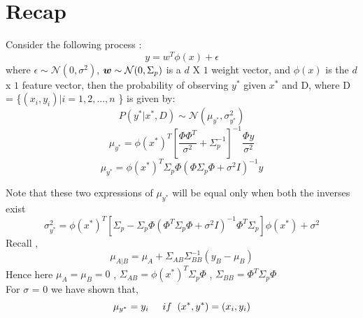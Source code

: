 \documentclass[12pt]{article}
\begin{document}
	\MakeScribeTop


\section{Recap}
Consider the following process :
\begin{equation}
    y=w^T\phi(x) + \epsilon 
\end{equation}
where $\epsilon \sim \mathcal{N}(0,\sigma^2)$, ${\boldsymbol w} \sim \mathcal{N}(0,\Sigma_p)$ is a $d$ X $1$ weight vector, and $\phi(x)$ is the $d$ x $1$ feature vector, then the probability of observing $y^*$ given $x^*$ and D, where D = \{$(x_i,y_i) | i=1,2,...,n$ \} is given by:  \\
\begin{equation*}
   P(y^*|x^*,D) \sim \mathcal{N}(\mu_{y^*},\sigma_{y^*}^2)
\end{equation*}
\begin{equation}
   \mu_{y^*} = \phi(x^*)^T\left[\dfrac{\Phi\Phi^T}{\sigma^2}+ \Sigma_p^{-1}\right]^{-1}\dfrac{\Phi y}{\sigma^2}    
\end{equation}
\begin{equation}
    \mu_{y^*} = \phi(x^*)^T\Sigma_p \Phi (\Phi \Sigma_p \Phi + \sigma^2 I)^{-1}y
\end{equation}

Note that these two expressions of $\mu_{y^*}$ will be equal only when both the inverses exist
\begin{equation}
    \sigma_{y^*}^2 = \phi(x^*)^T \left[\Sigma_p - \Sigma_p \Phi(\Phi^T \Sigma_p \Phi + \sigma^2 I)^{-1}\Phi^T \Sigma_p\right]\phi(x^*)+\sigma^2 
\end{equation}
Recall ,\begin{equation*}
    \mu_{A|B} = \mu_A + \Sigma_{AB}\Sigma_{BB}^{-1}(y_B-\mu_B)
\end{equation*} 
Hence here $\mu_A=\mu_B = 0$ ,\hspace{2mm}  $\Sigma_{AB} = \phi(x^*)^T\Sigma_p\Phi$ ,\hspace{2mm}  $\Sigma_{BB}=\Phi^T\Sigma_p\Phi $\\

For $\sigma$ = 0 we have shown that,\vspace{-5mm}
\begin{equation}
    \mu_{y^*} = y_i \hspace{5mm} if \hspace{2mm} (x^*,y^*) = (x_i,y_i) 
\end{equation}
\end{document}
